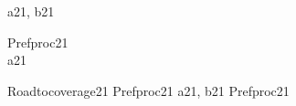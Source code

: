 \begin{circus}
\circchannel a21, b21 \\
\end {circus}
\begin {circus}
\circprocess Prefproc21 \circdef \circbegin \\
	\circspot
	    a21 \then \Skip \\
	\circend
\end{circus}
\begin{circus}
\circprocess Roadtocoverage21 \circdef Prefproc21 \lpar \lchanset a21, b21 \rchanset \rpar Prefproc21 \\
\end{circus}
